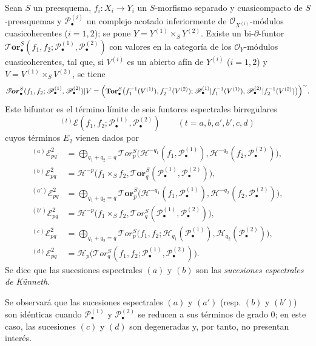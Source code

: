 \begin{theorem}[6.7.3]
\label{III.6.7.3}
Sean $S$ un preesquema, $f_i:X_i\to Y_i$ un $S$-morfismo separado y
cuasicompacto de $S$-preesquemas y $\mathscr P_\bullet^{(i)}$ un complejo
acotado inferiormente de $\mathscr O_{X^{(i)}}$-módulos cuasicoherentes
($i=1,2$); se pone $Y=Y^{(1)}\times_S Y^{(2)}$. Existe un
bi-$\partial$-funtor
  $\boldsymbol{\mathscr{T}\!or}_\bullet^S
(f_1,f_2;\mathscr P_\bullet^{(1)},\mathscr P_\bullet^{(2)})$
con valores en la categoría de los $\mathscr O_Y$-módulos cuasicoherentes,
tal que, si $V^{(i)}$ es un abierto afín de $Y^{(i)}$ ($i=1,2$) y
$V=V^{(1)}\times_S V^{(2)}$, se tiene
\[
  \boldsymbol{\mathscr{T}\!or}_\bullet^S
  (f_1,f_2;\mathscr P_\bullet^{(1)},\mathscr P_\bullet^{(2)})|V
  =\Bigl(\mathbf{Tor}_\bullet^S
    \bigl(f_1^{-1}(V^{(1)}),f_2^{-1}(V^{(2)});
      \mathscr P_\bullet^{(1)}|f_1^{-1}(V^{(1)}),
      \mathscr P_\bullet^{(2)}|f_2^{-1}(V^{(2)})\bigr)\Bigr)^{\sim}.
\]
Este bifuntor es el término límite de seis funtores espectrales
birregulares
\[
  {}^{(t)}\mathscr E
  (f_1,f_2;\mathscr P_\bullet^{(1)},\mathscr P_\bullet^{(2)})
  \qquad(t=a,b,a',b',c,d)
\]
cuyos términos $E_2$ vienen dados por
\[
\begin{aligned}
  {}^{(a)}\mathscr E_{pq}^2
  &=\bigoplus_{q_1+q_2=q}
    \mathscr{T}\!or_p^S
    \bigl(\mathcal H^{-q_1}(f_1,\mathscr P_\bullet^{(1)}),
          \mathcal H^{-q_2}(f_2,\mathscr P_\bullet^{(2)})\bigr),\\
  {}^{(b)}\mathscr E_{pq}^2
  &=\mathscr H^{-p}\bigl(f_1\times_S f_2,
    \boldsymbol{\mathscr{T}\!or}_q^S
    (\mathscr P_\bullet^{(1)},\mathscr P_\bullet^{(2)})\bigr),\\
  {}^{(a')}\mathscr E_{pq}^2
  &=\bigoplus_{q_1+q_2=q}
    \boldsymbol{\mathscr{T}\!or}_p^S
    \bigl(\mathscr H^{-q_1}(f_1,\mathscr P_\bullet^{(1)}),
          \mathscr H^{-q_2}(f_2,\mathscr P_\bullet^{(2)})\bigr),\\
  {}^{(b')}\mathscr E_{pq}^2
  &=\mathcal H^{-p}\bigl(f_1\times_S f_2,
    \mathscr{T}\!or_q^S
    (\mathscr P_\bullet^{(1)},\mathscr P_\bullet^{(2)})\bigr),\\
  {}^{(c)}\mathscr E_{pq}^2
  &=\bigoplus_{q_1+q_2=q}
    \mathscr{T}\!or_p^S
    \bigl(f_1,f_2;
      \mathscr H_{q_1}(\mathscr P_\bullet^{(1)}),
      \mathscr H_{q_2}(\mathscr P_\bullet^{(2)})\bigr),\\
  {}^{(d)}\mathscr E_{pq}^2
  &=\mathscr H_p\bigl(\mathscr{T}\!or_q^S
    (f_1,f_2;\mathscr P_\bullet^{(1)},\mathscr P_\bullet^{(2)})\bigr).
\end{aligned}
\]
Se dice que las sucesiones espectrales $(a)$ y $(b)$ son las
\emph{sucesiones espectrales de Künneth}.

Se observará que las sucesiones espectrales $(a)$ y $(a')$ (resp.
$(b)$ y $(b')$) son idénticas cuando $\mathscr P_\bullet^{(1)}$ y
$\mathscr P_\bullet^{(2)}$ se reducen a sus términos de grado 0; en este caso,
las sucesiones $(c)$ y $(d)$ son degeneradas y, por tanto, no presentan
interés.
\end{theorem}

